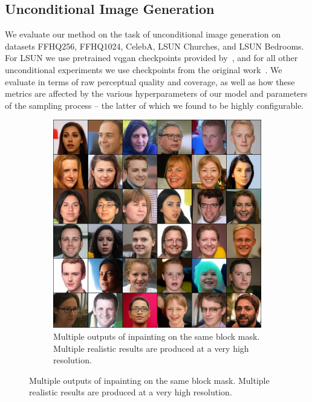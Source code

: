 \subsection{Unconditional Image Generation}

We evaluate our method on the task of unconditional image generation on datasets
FFHQ256, FFHQ1024, CelebA, LSUN Churches, and LSUN Bedrooms. For LSUN we use
pretrained \gls{vqgan} checkpoints provided by~\cite{bondtaylor2021unleashing},
and for all other unconditional experiments we use checkpoints from the original
work~\cite{esser2021taming}. We evaluate in terms of raw perceptual quality and
coverage, as well as how these metrics are affected by the various
hyperparameters of our model and parameters of the sampling process -- the
latter of which we found to be highly configurable.

\begin{figure}[ht]
    \centering
    \begin{subfigure}[b]{\textwidth}
        \centering
        \includegraphics[width=1.0\textwidth]{figures/ffhq256-samples.png}
        \caption{
            Multiple outputs of inpainting on the same block mask. Multiple
            realistic results are produced at a very high resolution.
        }
    \end{subfigure}
\end{figure}

